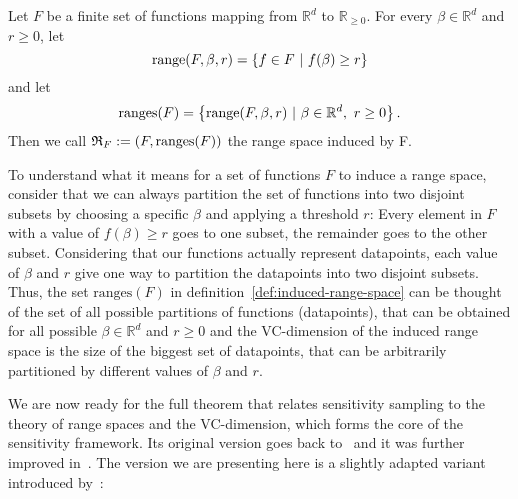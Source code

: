\begin{definition}
    \label{def:induced-range-space}
    Let $F$ be a finite set of functions mapping from $\mathbb{R}^d$ to
    $\mathbb{R}_{\geq 0}$.
    For every $\beta \in \mathbb{R}^d$ and $r \geq 0$, let
    \begin{equation*}
        \textup{range}(F, \beta, r) = \left\{ f \in F \ | \  f(\beta) \geq r  \right\}
    \end{equation*}
    and let
    \begin{equation*}
        \textup{ranges}(F) = \left\{ \textup{range}(F, \beta, r) \ | \ \beta \in \mathbb{R}^d, \ r \geq 0  \right\}.
    \end{equation*}
    Then we call $\mathfrak{R}_F := (F, \textup{ranges}(F))$ the range space induced by F.
\end{definition}

To understand what it means for a set of functions $F$ to induce
a range space, consider that we can always partition the set
of functions into two disjoint subsets by choosing
a specific $\beta$ and applying a threshold $r$:
Every element in $F$ with a value of $f(\beta) \geq r$ goes to
one subset, the remainder goes to the other subset.
Considering that our functions actually represent datapoints,
each value of $\beta$ and $r$ give one way to partition the
datapoints into two disjoint subsets.
Thus, the set $\text{ranges}(F)$ in definition~\ref{def:induced-range-space}
can be thought of the set of all possible partitions of
functions (datapoints), that can be obtained for all
possible $\beta \in \mathbb{R}^d$ and $r \geq 0$ and the
VC-dimension of the induced range space is the size of the
biggest set of datapoints, that can be arbitrarily partitioned
by different values of $\beta$ and $r$.

We are now ready for the full theorem that relates sensitivity sampling
to the theory of range spaces and the VC-dimension, which forms
the core of the sensitivity framework.
Its original version goes back to~\cite{feldman-langberg-coresets}
and it was further improved in~\cite{braverman-feldman-coresets}.
The version we are presenting here is a slightly
adapted variant introduced by~\cite{big-data-tiny-data}:

